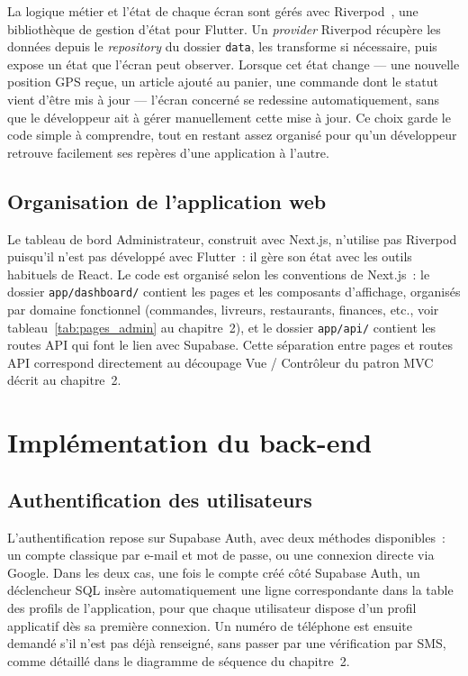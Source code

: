 \documentclass[12pt,fleqn,a4paper]{report}
\begin{document}
\begin{justify}
La logique métier et l'état de chaque écran sont gérés avec Riverpod~\cite{riverpod_docs}, une bibliothèque de gestion d'état pour Flutter. Un \textit{provider} Riverpod récupère les données depuis le \textit{repository} du dossier \texttt{data}, les transforme si nécessaire, puis expose un état que l'écran peut observer. Lorsque cet état change — une nouvelle position GPS reçue, un article ajouté au panier, une commande dont le statut vient d'être mis à jour — l'écran concerné se redessine automatiquement, sans que le développeur ait à gérer manuellement cette mise à jour. Ce choix garde le code simple à comprendre, tout en restant assez organisé pour qu'un développeur retrouve facilement ses repères d'une application à l'autre.

\subsection{Organisation de l'application web}

Le tableau de bord Administrateur, construit avec Next.js, n'utilise pas Riverpod puisqu'il n'est pas développé avec Flutter~: il gère son état avec les outils habituels de React. Le code est organisé selon les conventions de Next.js~: le dossier \texttt{app/dashboard/} contient les pages et les composants d'affichage, organisés par domaine fonctionnel (commandes, livreurs, restaurants, finances, etc., voir tableau~\ref{tab:pages_admin} au chapitre~2), et le dossier \texttt{app/api/} contient les routes API qui font le lien avec Supabase. Cette séparation entre pages et routes API correspond directement au découpage Vue / Contrôleur du patron MVC décrit au chapitre~2.

\section{Implémentation du back-end}

\subsection{Authentification des utilisateurs}

L'authentification repose sur Supabase Auth, avec deux méthodes disponibles~: un compte classique par e-mail et mot de passe, ou une connexion directe via Google. Dans les deux cas, une fois le compte créé côté Supabase Auth, un déclencheur SQL insère automatiquement une ligne correspondante dans la table des profils de l'application, pour que chaque utilisateur dispose d'un profil applicatif dès sa première connexion. Un numéro de téléphone est ensuite demandé s'il n'est pas déjà renseigné, sans passer par une vérification par SMS, comme détaillé dans le diagramme de séquence du chapitre~2.


\end{justify}
\end{document}

